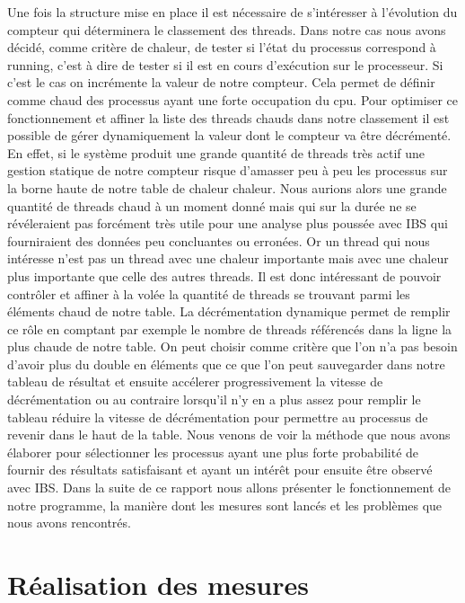       Une fois la structure mise en place il est nécessaire de s’intéresser à
      l'évolution du compteur qui déterminera le classement des threads.  Dans
      notre cas nous avons décidé, comme critère de chaleur, de tester si l'état
      du processus correspond à \og running\fg, c'est à dire de tester si il est
      en cours d’exécution sur le processeur. Si c'est le cas on incrémente la
      valeur de notre compteur. Cela permet de définir comme chaud des processus
      ayant une forte occupation du cpu.  Pour optimiser ce fonctionnement et
      affiner la liste des threads chauds dans notre classement il est possible
      de gérer dynamiquement la valeur dont le compteur va être décrémenté. En
      effet, si le système produit une grande quantité de threads très actif une
      gestion statique de notre compteur risque d'amasser peu à peu les
      processus sur la borne haute de notre table de chaleur chaleur. Nous
      aurions alors une grande quantité de threads chaud à un moment donné mais
      qui sur la durée ne se révéleraient pas forcément très utile pour une
      analyse plus poussée avec IBS qui fourniraient des données peu concluantes
      ou erronées.  Or un thread qui nous intéresse n'est pas un thread avec une
      chaleur importante mais avec une chaleur plus importante que celle des
      autres threads. Il est donc intéressant de pouvoir contrôler et affiner à
      la volée la quantité de threads se trouvant parmi les éléments chaud de
      notre table. La décrémentation dynamique permet de remplir ce rôle en
      comptant par exemple le nombre de threads référencés dans la ligne la plus
      chaude de notre table. On peut choisir comme critère que l'on n'a pas
      besoin d'avoir plus du double en éléments que ce que l'on peut sauvegarder
      dans notre tableau de résultat et ensuite accélerer progressivement la
      vitesse de décrémentation ou au contraire lorsqu'il n'y en a plus assez
      pour remplir le tableau réduire la vitesse de décrémentation pour
      permettre au processus de revenir dans le haut de la table.  Nous venons
      de voir la méthode que nous avons élaborer pour sélectionner les processus
      ayant une plus forte probabilité de fournir des résultats satisfaisant et
      ayant un intérêt pour ensuite être observé avec IBS. Dans la suite de ce
      rapport nous allons présenter le fonctionnement de notre programme, la
      manière dont les mesures sont lancés et les problèmes que nous avons
      rencontrés.


  \section{Réalisation des mesures}


